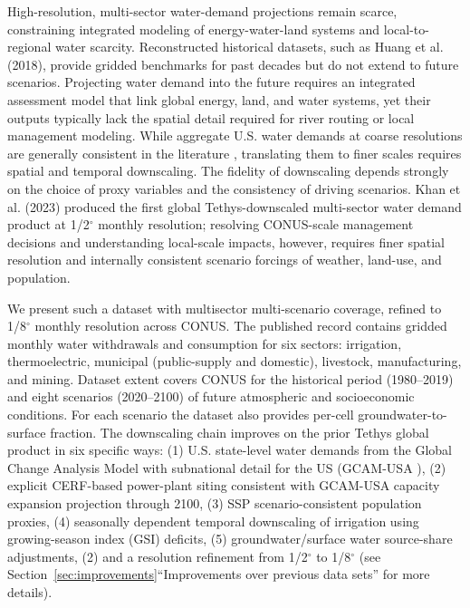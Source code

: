 \documentclass[fleqn,10pt]{wlscirep}
\begin{document}
High-resolution, multi-sector water-demand projections remain scarce, constraining integrated modeling of energy-water-land systems and local-to-regional water scarcity. Reconstructed historical datasets, such as Huang et al. (2018)\cite{Huang2018}, provide gridded benchmarks for past decades but do not extend to future scenarios. Projecting water demand into the future requires an integrated assessment model that link global energy, land, and water systems, yet their outputs typically lack the spatial detail required for river routing or local management modeling\cite{Wada_2017, van_Vliet_2021}. While aggregate U.S. water demands at coarse resolutions are generally consistent in the literature \cite{Zhao_gcamusa_water, naseri2025united, Stets2025USGS}, translating them to finer scales requires spatial and temporal downscaling\cite{hess-17-4555-2013, van_Vliet_2021, Jones_2024}. The fidelity of downscaling depends strongly on the choice of proxy variables and the consistency of driving scenarios. Khan et al. (2023)\cite{Khan2023} produced the first global Tethys-downscaled multi-sector water demand product at 1/2$^{\circ}$ monthly resolution; resolving CONUS-scale management decisions and understanding local-scale impacts, however, requires finer spatial resolution and internally consistent scenario forcings of weather, land-use, and population.

We present such a dataset with multisector multi-scenario coverage, refined to 1/8$^{\circ}$ monthly resolution across CONUS. The published record contains gridded monthly water withdrawals and consumption for six sectors: irrigation, thermoelectric, municipal (public-supply and domestic), livestock, manufacturing, and mining. Dataset extent covers CONUS for the historical period (1980--2019) and eight scenarios (2020--2100) of future atmospheric and socioeconomic conditions. For each scenario the dataset also provides per-cell groundwater-to-surface fraction. The downscaling chain improves on the prior Tethys global product in six specific ways: (1) U.S. state-level water demands from the Global Change Analysis Model with subnational detail for the US (GCAM-USA \cite{Zhao_gcamusa_water,Zhao2024,Calvin2019GCAM,Binsted_2022}), (2) explicit CERF-based\cite{Vernon2021} power-plant siting consistent with GCAM-USA capacity expansion projection through 2100, (3) SSP scenario-consistent population proxies, (4) seasonally dependent temporal downscaling of irrigation using growing-season index (GSI) deficits, (5) groundwater/surface water source-share adjustments, (2) and a resolution refinement from 1/2$^{\circ}$ to 1/8$^{\circ}$ (see Section~\ref{sec:improvements}``Improvements over previous data sets'' for more details). 
\end{document}
